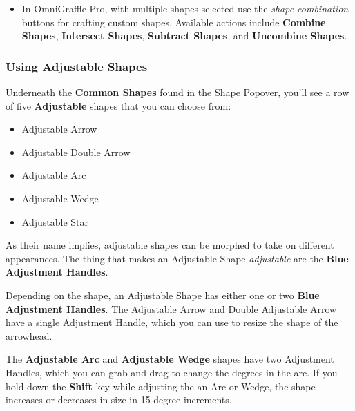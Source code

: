 \documentclass[../main.tex]{subfiles}
\begin{document}
\begin{ogpro}
  \begin{itemize}
    \item In OmniGraffle Pro, with multiple shapes selected use the \textit{shape combination}
      buttons for crafting custom shapes. Available actions include \textbf{Combine Shapes},
      \textbf{Intersect Shapes}, \textbf{Subtract Shapes}, and \textbf{Uncombine Shapes}.

  \end{itemize}
\end{ogpro}

\subsubsection{Using Adjustable Shapes}

Underneath the \textbf{Common Shapes} found in the Shape Popover, you'll see a row of five
\textbf{Adjustable} shapes that you can choose from:

\begin{itemize}
  \item Adjustable Arrow
  \item Adjustable Double Arrow
  \item Adjustable Arc
  \item Adjustable Wedge
  \item Adjustable Star
\end{itemize}


As their name implies, adjustable shapes can be morphed to take on different appearances. The
thing that makes an Adjustable Shape \textit{adjustable} are the \textbf{Blue Adjustment
Handles}.

Depending on the shape, an Adjustable Shape has either one or two \textbf{Blue Adjustment
Handles}. The Adjustable Arrow and Double Adjustable Arrow have a single Adjustment Handle,
which you can use to resize the shape of the arrowhead.


The \textbf{Adjustable Arc} and \textbf{Adjustable Wedge} shapes have two Adjustment Handles,
which you can grab and drag to change the degrees in the arc. If you hold down the
\textbf{Shift} key while adjusting the an Arc or Wedge, the shape increases or decreases in
size in 15-degree increments.
\end{document}
